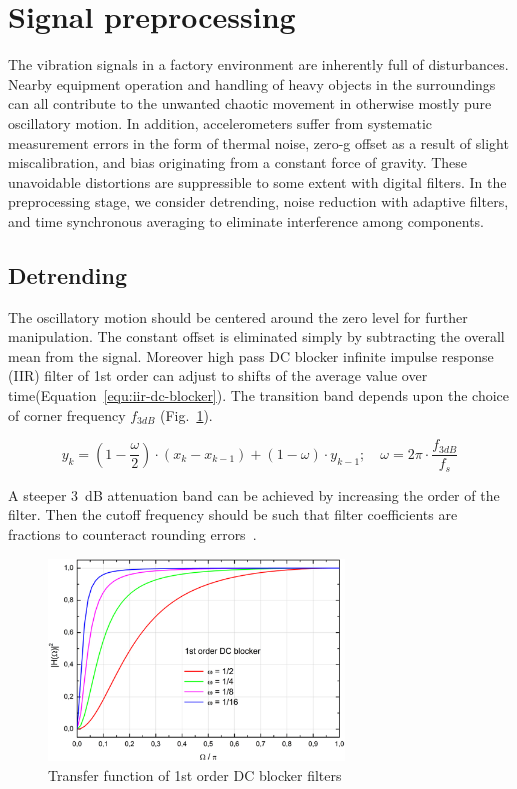 \section{Signal preprocessing}
The vibration signals in a factory environment are inherently full of disturbances. Nearby equipment operation and handling of heavy objects in the surroundings can all contribute to the unwanted chaotic movement in otherwise mostly pure oscillatory motion. In addition, accelerometers suffer from systematic measurement errors in the form of thermal noise, zero-g offset as a result of slight miscalibration, and bias originating from a constant force of gravity. These unavoidable distortions are suppressible to some extent with digital filters. In the preprocessing stage, we consider detrending, noise reduction with adaptive filters, and time synchronous averaging to eliminate interference among components.

\subsection{Detrending}
The oscillatory motion should be centered around the zero level for further manipulation. The constant offset is eliminated simply by subtracting the overall mean from the signal. Moreover high pass DC blocker infinite impulse response (IIR) filter of 1st order can adjust to shifts of the average value over time(Equation~\ref{equ:iir-dc-blocker}). The transition band depends upon the choice of corner frequency $f_{3dB}$ (Fig.~\ref{fig:dc-blocker}).

\begin{equation} \label{equ:iir-dc-blocker}
y_k = (1 - \frac{\omega}{2}) \cdot (x_k  -  x_{k - 1}) + (1 - \omega) \cdot y_{k - 1}; \quad \omega = 2\pi \cdot \frac{f_{3dB}}{f_s}
\end{equation}

A steeper 3~dB attenuation band can be achieved by increasing the order of the filter. Then the cutoff frequency should be such that filter coefficients are fractions to counteract rounding errors~\cite{tittelbach-helmrich_digital_2021}.

\begin{figure}[h]
	\centering
	\includegraphics[width=0.7\textwidth]{assets/iir-1-dc-blocker-band.jpg}
	\caption{Transfer function of 1st order DC blocker filters ~\cite{tittelbach-helmrich_digital_2021}}
	\label{fig:dc-blocker}
\end{figure}

